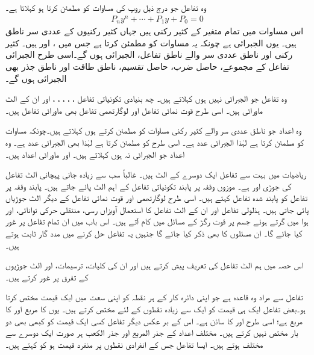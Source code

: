 وہ تفاعل  جو درج ذیل روپ کی مساوات کو مطمئن کرتا ہو  کہلاتا ہے۔
\begin{align*}
P_ny^n+\cdots+P_1y+P_0=0
\end{align*}
اس مساوات میں تمام  متغیر  کے کثیر رکنی ہیں جہاں کثیر رکنیوں کے عددی سر ناطق ہیں۔ یوں  الجبرائی ہے چونکہ یہ مساوات  کو مطمئن کرتا ہے جس میں ،  اور  ہیں۔ کثیر رکنی اور ناطق عددی سر والے ناطق تفاعل، الجبرائی ہوں گے۔اسی طرح الجبرائی تفاعل کے مجموعے، حاصل ضرب، حاصل تقسیم، ناطق طاقت اور ناطق جذر بھی الجبرائی ہوں گے۔

وہ تفاعل جو الجبرائی نہیں ہوں  کہلاتے ہیں۔ چھ بنیادی تکونیاتی تفاعل ، ، ، ، ،  اور ان کے الٹ ماورائی ہیں۔ اسی طرح قوت نمائی تفاعل اور لوگارتھمی تفاعل بھی ماورائی تفاعل ہیں۔

وہ اعداد جو ناطق عددی سر والے کثیر رکنی مساوات کو مطمئن کرتے ہوں  کہلاتے ہیں۔چونکہ  مساوات  کو مطمئن کرتا ہے لہٰذا  الجبرائی عدد ہے۔ اسی طرح  کو  مطمئن کرتا ہے لہٰذا  بھی الجبرائی عدد ہے۔ وہ اعداد جو الجبرائی نہ ہوں  کہلاتے ہیں۔  اور  ماورائی اعداد ہیں۔

  ریاضیات میں بہت سے تفاعل ایک دوسرے کے الٹ ہیں۔ غالباً سب سے زیادہ جانی پہچانی الٹ تفاعل کی جوڑی  اور  ہے۔ موزوں وقفہ پر پابند تکونیاتی تفاعل کے اہم الٹ پائے  جاتے ہیں۔ پابند وقفہ پر تفاعل کو پابند شدہ تفاعل کہتے ہیں۔ اسی طرح  لوگارتھمی اور قوت نمائی تفاعل کے دیگر الٹ جوڑیاں پائی جاتی ہیں۔ ہذلولی تفاعل اور ان کے الٹ تفاعل کا استعمال آویزاں رسی، منتقلی حرکی توانائی، اور ہوا میں گرتے ہوئے جسم پر قوت رگڑ کے مسائل میں کام آتے ہیں۔ اس باب میں ان تمام تفاعل پر غور کیا جائے گا۔ ان مسئلوں کا بھی ذکر کیا جائے گا جنہیں یہ تفاعل حل کرنے میں مدد گار ثابت ہوتے ہیں۔

اس حصہ میں ہم الٹ تفاعل کی تعریف پیش کرتے ہیں اور ان کی کلیات، ترسیمات، اور الٹ جوڑیوں کے تفرق پر غور کرتے ہیں۔

تفاعل سے مراد وہ قاعدہ ہے جو اپنی دائرہ کار کے ہر نقطہ کو اپنی سعت میں ایک قیمت مختص کرتا ہو۔بعض تفاعل ایک ہی قیمت کو ایک سے زیادہ  نقطوں  کے لئے مختص کرتے ہیں۔ یوں  کا مربع اور  کا مربع  ہے؛ اسی طرح  اور  کا سائن  ہے۔ اس کے بر عکس دیگر تفاعل کسی ایک قیمت کو کبھی بھی دو بار مختص نہیں کرتے ہیں۔ مختلف اعداد کے جذر المربع اور جذر الکعب ہر صورت ایک دوسرے سے مختلف ہوتے ہیں۔ ایسا تفاعل جس کے انفرادی نقطوں پر منفرد قیمت ہو کو  کہتے ہیں۔

